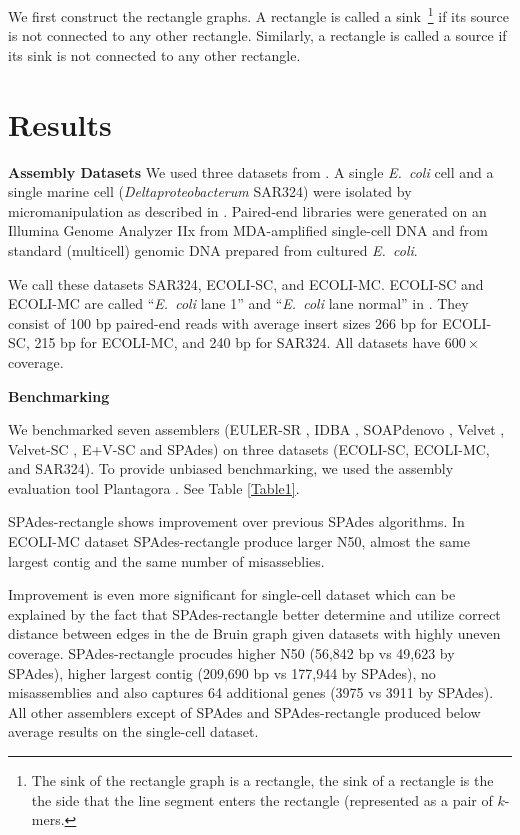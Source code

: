 \documentclass[a4paper]{article}
\def\ecoli{\emph{E.~coli}}
\def\spades{SPAdes}
\begin{document}
We first construct the rectangle graphs. A rectangle is called a sink~\footnote{The sink of the rectangle graph is a rectangle, the sink of 
a rectangle is the the side that the line segment enters the rectangle (represented as a pair of $k$-mers.} if its source is not connected 
to any other rectangle. Similarly, a rectangle is called a source if its sink is not connected to any other rectangle.  

\section{Results}

\textbf{Assembly Datasets}
We used three datasets from \cite{Chitsaz2011}.
A single {\ecoli} cell
and a single marine cell ({\em Deltaproteobacterum} SAR324)
were isolated by micromanipulation as described in \cite{Ishoey2008}.
Paired-end libraries were generated on an Illumina Genome Analyzer IIx from MDA-amplified single-cell DNA
and from standard (multicell) genomic DNA prepared from cultured {\ecoli}.

We call these datasets SAR324, ECOLI-SC, and ECOLI-MC.
ECOLI-SC and ECOLI-MC are called ``{\ecoli} lane 1'' and ``{\ecoli} lane normal'' in \cite{Chitsaz2011}.
They consist of 100 bp paired-end reads
with average insert sizes 266 bp for ECOLI-SC, 215 bp for ECOLI-MC,
and 240 bp for SAR324.
All datasets have $600\times$ coverage.

\textbf{Benchmarking}

We benchmarked seven assemblers
(EULER-SR \cite{Chaisson08}, IDBA \cite{Peng10}, SOAPdenovo \cite{Li10}, Velvet \cite{Zerbino08}, Velvet-SC \cite{Chitsaz2011}, E+V-SC \cite{Chitsaz2011} and {\spades}) on three datasets
(ECOLI-SC, ECOLI-MC, and SAR324). To provide unbiased
benchmarking, we used the assembly evaluation tool Plantagora \cite{Barthelson2011}. See Table \ref{Table1}.

{\spades}-rectangle shows improvement over previous SPAdes algorithms. In ECOLI-MC dataset {\spades}-rectangle produce larger N50, almost the same largest contig and the same number of misasseblies.

Improvement is even more significant for single-cell dataset which can be explained by the fact that {\spades}-rectangle better determine and utilize correct distance between edges in the de Bruin graph given datasets with highly uneven coverage. {\spades}-rectangle procudes higher N50 (56,842 bp vs 49,623 by {\spades}), higher largest contig (209,690 bp vs 177,944 by {\spades}), no misassemblies and also captures 64 additional genes (3975 vs 3911 by {\spades}). All other assemblers except of {\spades} and {\spades}-rectangle produced below average results on the single-cell dataset.
\end{document}
